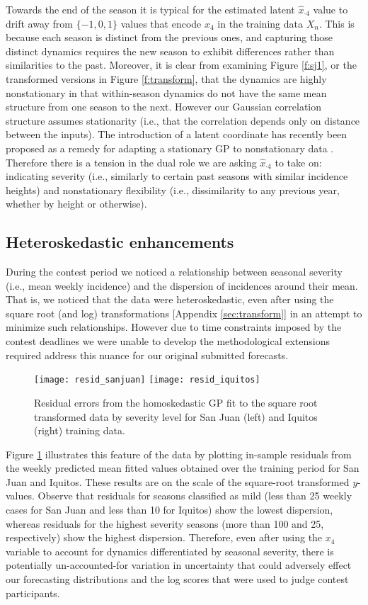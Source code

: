 \documentclass[12pt]{article}
\begin{document}
Towards the end of the season it is typical for the estimated latent
$\hat{x}_{\cdot 4}$ value to drift away from $\{-1, 0, 1\}$ values that encode
$x_4$ in the training data $X_n$.  This is because each season is distinct
from the previous ones, and capturing those distinct dynamics requires the new
season to exhibit differences rather than similarities to the past.  Moreover,
it is clear from examining Figure \ref{f:sj1}, or the transformed versions in
Figure \ref{f:transform}, that the dynamics are highly nonstationary in that
within-season dynamics do not have the same mean structure from one season to
the next. However our Gaussian correlation structure assumes stationarity
(i.e., that the correlation depends only on distance between the inputs). The
introduction of a latent coordinate has recently been proposed as a remedy for
adapting a stationary GP to nonstationary data
\citep{bornn:shaddick:zidek:2012}.  Therefore there is a tension in the dual
role we are asking $\hat{x}_{\cdot 4}$ to take on: indicating severity (i.e.,
similarly to certain past seasons with similar incidence heights) and
nonstationary flexibility (i.e., dissimilarity to any previous year, whether
by height or otherwise).

\subsection{Heteroskedastic enhancements}
\label{sec:het}

During the contest period we noticed a relationship between seasonal severity
(i.e., mean weekly incidence) and the dispersion of incidences around their
mean.  That is, we noticed that the data were heteroskedastic, even after
using the square root (and log) transformations [Appendix \ref{sec:transform}]
in an attempt to minimize such relationships.  However due to time constraints
imposed by the contest deadlines we were unable to develop the methodological
extensions required address this nuance for our original submitted forecasts.
\begin{figure}[ht!]
\centering
\texttt{[image: resid\_sanjuan]}
\texttt{[image: resid\_iquitos]}
\caption{Residual errors from the homoskedastic GP fit to the square root
transformed data by severity level for San Juan (left) and Iquitos (right)
training data.}
\label{f:resid}
\end{figure}
Figure \ref{f:resid} illustrates this feature of the data by plotting
in-sample residuals from the weekly predicted mean fitted values obtained over
the training period for San Juan and Iquitos.  These results are on the scale
of the square-root transformed $y$-values.  Observe that residuals for seasons
classified as mild (less than 25 weekly cases for San Juan and less
than 10 for Iquitos) show the lowest dispersion, whereas residuals for the
highest severity seasons (more than 100 and 25, respectively) show the highest
dispersion.  Therefore, even after using the $x_4$ variable to account for
dynamics differentiated by seasonal severity, there is potentially
un-accounted-for variation in uncertainty that could adversely effect our
forecasting distributions and the log scores that were used to judge contest
participants.
\end{document}
